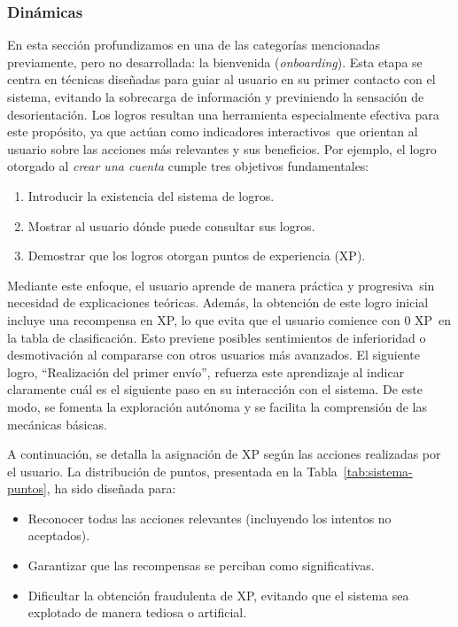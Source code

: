  \subsubsection{Dinámicas}
En esta sección profundizamos en una de las categorías mencionadas previamente, pero no desarrollada: la bienvenida (\textit{onboarding}). Esta etapa se centra en técnicas diseñadas para guiar al usuario en su primer contacto con el sistema, evitando la sobrecarga de información y previniendo la sensación de desorientación. Los logros resultan una herramienta especialmente efectiva para este propósito, ya que actúan como indicadores interactivos\ que orientan al usuario sobre las acciones más relevantes y sus beneficios.
Por ejemplo, el logro otorgado al \textit{crear una cuenta} cumple tres objetivos fundamentales:
\begin{enumerate}
    \item Introducir la existencia del sistema de logros.
    \item Mostrar al usuario dónde puede consultar sus logros.
    \item Demostrar que los logros otorgan puntos de experiencia (XP).
\end{enumerate}
Mediante este enfoque, el usuario aprende de manera práctica y progresiva\, sin necesidad de explicaciones teóricas. Además, la obtención de este logro inicial incluye una recompensa en XP, lo que evita que el usuario comience con 0 XP\ en la tabla de clasificación. Esto previene posibles sentimientos de inferioridad o desmotivación al compararse con otros usuarios más avanzados.
El siguiente logro, \enquote{Realización del primer envío}, refuerza este aprendizaje al indicar claramente cuál es el siguiente paso en su interacción con el sistema. De este modo, se fomenta la exploración autónoma y se facilita la comprensión de las mecánicas básicas.

A continuación, se detalla la asignación de XP según las acciones realizadas por el usuario. La distribución de puntos, presentada en la Tabla~\ref{tab:sistema-puntos}, ha sido diseñada para:
\begin{itemize}
    \item Reconocer todas las acciones relevantes (incluyendo los intentos no aceptados).
    \item Garantizar que las recompensas se perciban como significativas.
    \item Dificultar la obtención fraudulenta de XP, evitando que el sistema sea explotado de manera tediosa o artificial.
\end{itemize}

